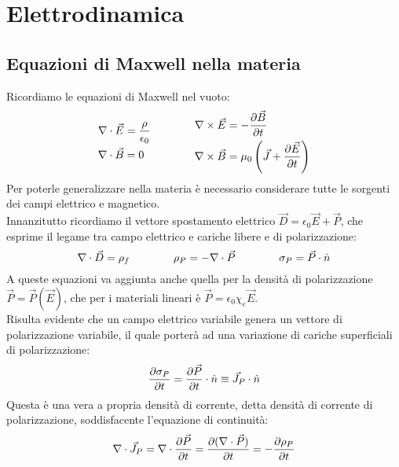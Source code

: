 \documentclass[]{article}
\begin{document}
\section{Elettrodinamica}

\subsection{Equazioni di Maxwell nella materia}

Ricordiamo le equazioni di Maxwell nel vuoto:
\begin{equation}
	\begin{split}
		\nabla\cdot\vec{E} &= \frac{\rho}{\epsilon_0} \\ 
		\nabla\cdot\vec{B} &= 0 
	\end{split}
	\qquad\qquad
	\begin{split}
		\nabla\times\vec{E} &= - \frac{\partial\vec{B}}{\partial t} \\ 
		\nabla\times\vec{B} &= \mu_0 \left( \vec{J} + \frac{\partial\vec{E}}{\partial t} \right)
	\end{split}
	\label{eq:1}
\end{equation}
Per poterle generalizzare nella materia è necessario considerare tutte le sorgenti dei campi elettrico e magnetico. \\ 
%
Innanzitutto ricordiamo il vettore spostamento elettrico $ \vec{D} = \epsilon_0 \vec{E} + \vec{P} $, che esprime il legame tra campo elettrico e cariche libere e di polarizzazione:
\begin{equation}
	\nabla\cdot\vec{D} = \rho_f \qquad\qquad \rho_P = -\nabla\cdot\vec{P} \qquad\qquad \sigma_P = \vec{P}\cdot\hat{n}
	\label{eq:2}
\end{equation}
A queste equazioni va aggiunta anche quella per la densità di polarizzazione $ \vec{P} = \vec{P}(\vec{E}) $, che per i materiali lineari è $ \vec{P} = \epsilon_0 \chi_e \vec{E} $. \\ 
%
Risulta evidente che un campo elettrico variabile genera un vettore di polarizzazione variabile, il quale porterà ad una variazione di cariche superficiali di polarizzazione:
\begin{equation}
	\frac{\partial\sigma_P}{\partial t} = \frac{\partial\vec{P}}{\partial t} \cdot \hat{n} \equiv \vec{J}_P \cdot \hat{n}
	\label{eq:3}
\end{equation}
Questa è una vera a propria densità di corrente, detta densità di corrente di polarizzazione, soddisfacente l'equazione di continuità:
\begin{equation}
	\nabla\cdot\vec{J}_P = \nabla\cdot \frac{\partial\vec{P}}{\partial t} = \frac{\partial (\nabla\cdot\vec{P})}{\partial t} = - \frac{\partial\rho_P}{\partial t}
	\label{eq:4}
\end{equation}
\end{document}

